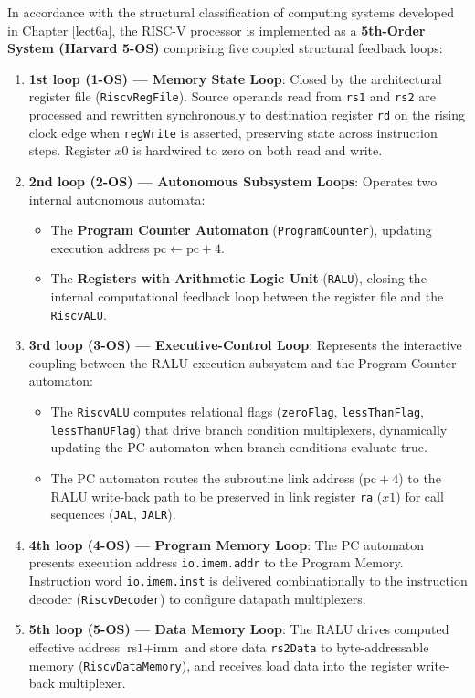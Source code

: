 In accordance with the structural classification of computing systems developed in Chapter \ref{lect6a}, the RISC-V processor is implemented as a \textbf{5th-Order System (Harvard 5-OS)} comprising five coupled structural feedback loops:
\begin{enumerate}
    \item \textbf{1st loop (1-OS) --- Memory State Loop}: Closed by the architectural register file (\texttt{RiscvRegFile}). Source operands read from \texttt{rs1} and \texttt{rs2} are processed and rewritten synchronously to destination register \texttt{rd} on the rising clock edge when \texttt{regWrite} is asserted, preserving state across instruction steps. Register $x0$ is hardwired to zero on both read and write.
    \item \textbf{2nd loop (2-OS) --- Autonomous Subsystem Loops}: Operates two internal autonomous automata:
    \begin{itemize}
        \item The \textbf{Program Counter Automaton} (\texttt{ProgramCounter}), updating execution address $\text{pc} \leftarrow \text{pc} + 4$.
        \item The \textbf{Registers with Arithmetic Logic Unit} (\texttt{RALU}), closing the internal computational feedback loop between the register file and the \texttt{RiscvALU}.
    \end{itemize}
    \item \textbf{3rd loop (3-OS) --- Executive-Control Loop}: Represents the interactive coupling between the RALU execution subsystem and the Program Counter automaton:
    \begin{itemize}
        \item The \texttt{RiscvALU} computes relational flags (\texttt{zeroFlag}, \texttt{lessThanFlag}, \texttt{lessThanUFlag}) that drive branch condition multiplexers, dynamically updating the PC automaton when branch conditions evaluate true.
        \item The PC automaton routes the subroutine link address ($\text{pc} + 4$) to the RALU write-back path to be preserved in link register \texttt{ra} ($x1$) for call sequences (\texttt{JAL}, \texttt{JALR}).
    \end{itemize}
    \item \textbf{4th loop (4-OS) --- Program Memory Loop}: The PC automaton presents execution address \texttt{io.imem.addr} to the Program Memory. Instruction word \texttt{io.imem.inst} is delivered combinationally to the instruction decoder (\texttt{RiscvDecoder}) to configure datapath multiplexers.
    \item \textbf{5th loop (5-OS) --- Data Memory Loop}: The RALU drives computed effective address $\text{rs1} + \text{imm}$ and store data \texttt{rs2Data} to byte-addressable memory (\texttt{RiscvDataMemory}), and receives load data into the register write-back multiplexer.
\end{enumerate}

